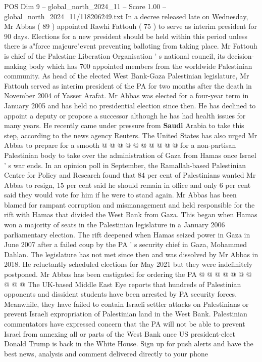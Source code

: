 \begin{textsample}{POS Dim 9 – global\_north\_2024\_11 – Score 1.00 – global\_north\_2024\_11/118206249.txt}  \label{ex:f9_pos_243}
In a decree released late on Wednesday, Mr Abbas ( 89 ) appointed Rawhi Fattouh ( 75 ) to serve as interim president for 90 days.
Elections for a new president should be held within this period unless there is a"force majeure"event preventing balloting from taking place.
Mr Fattouh is chief of the Palestine Liberation Organisation ' s national council, its decision-making body which has 700 appointed members from the worldwide Palestinian community.
As head of the elected West Bank-Gaza Palestinian legislature, Mr Fattouh served as interim president of the PA for two months after the death in November 2004 of Yasser Arafat.
Mr Abbas was elected for a four-year term in January 2005 and has held no presidential election since then.
He has declined to appoint a deputy or propose a successor although he has had health issues for many years.
He recently came under pressure from \textbf{Saudi} Arabia to take this step, according to the news agency Reuters.
The United States has also urged Mr Abbas to prepare for a smooth @ @ @ @ @ @ @ @ @ @ for a non-partisan Palestinian body to take over the administration of Gaza from Hamas once Israel ' s war ends.
In an opinion poll in September, the Ramallah-based Palestinian Centre for Policy and Research found that 84 per cent of Palestinians wanted Mr Abbas to resign, 15 per cent said he should remain in office and only 6 per cent said they would vote for him if he were to stand again.
Mr Abbas has been blamed for rampant corruption and mismanagement and held responsible for the rift with Hamas that divided the West Bank from Gaza.
This began when Hamas won a majority of seats in the Palestinian legislature in a January 2006 parliamentary election.
The rift deepened when Hamas seized power in Gaza in June 2007 after a failed coup by the PA ' s security chief in Gaza, Mohammed Dahlan.
The legislature has not met since then and was dissolved by Mr Abbas in 2018.
He reluctantly scheduled elections for May 2021 but they were indefinitely postponed.
Mr Abbas has been castigated for ordering the PA @ @ @ @ @ @ @ @ @ @ The UK-based Middle East Eye reports that hundreds of Palestinian opponents and dissident students have been arrested by PA security forces.
Meanwhile, they have failed to contain Israeli settler attacks on Palestinians or prevent Israeli expropriation of Palestinian land in the West Bank.
Palestinian commentators have expressed concern that the PA will not be able to prevent Israel from annexing all or parts of the West Bank once US president-elect Donald Trump is back in the White House.
Sign up for push alerts and have the best news, analysis and comment delivered directly to your phone

\end{textsample}
